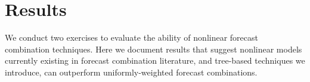\documentclass[12pt]{article}
\begin{document}






\section{Results}
We conduct two exercises to evaluate the ability of nonlinear forecast combination techniques. Here we document results that suggest nonlinear models currently existing in forecast combination literature, and tree-based techniques we introduce, can outperform uniformly-weighted forecast combinations. 
\end{document}

